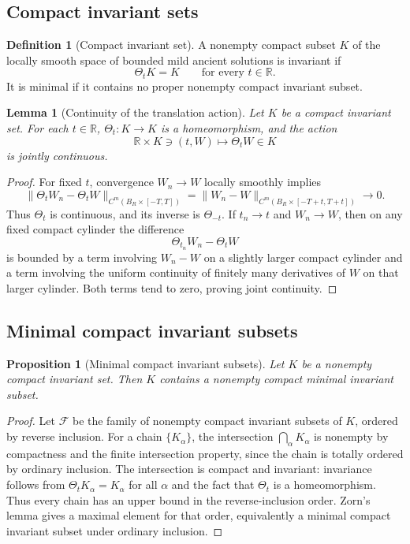 \documentclass[11pt]{amsart}
\theoremstyle{plain}
\newtheorem{lemma}[lemma]{Lemma}
\newtheorem{proposition}[proposition]{Proposition}
\theoremstyle{definition}
\newtheorem{definition}[definition]{Definition}
\theoremstyle{remark}
\numberwithin{equation}{section}
\newcommand{\R}{\mathbb R}
\begin{document}
\subsection{Compact invariant sets}

\begin{definition}[Compact invariant set]\label{p2:def:compact-invariant}
A nonempty compact subset \(K\) of the locally smooth space of bounded mild
ancient solutions is invariant if
\[
   \Theta_tK=K
   \qquad\text{for every }t\in\R .
\]
It is minimal if it contains no proper nonempty compact invariant subset.
\end{definition}

\begin{lemma}[Continuity of the translation action]\label{p2:lem:action-continuity}
Let \(K\) be a compact invariant set.  For each \(t\in\R\),
\(\Theta_t:K\to K\) is a homeomorphism, and the action
\[
   \R\times K\ni(t,W)\mapsto \Theta_tW\in K
\]
is jointly continuous.
\end{lemma}

\begin{proof}
For fixed \(t\), convergence \(W_n\to W\) locally smoothly implies
\[
   \|\Theta_tW_n-\Theta_tW\|_{C^m(B_R\times[-T,T])}
   =
   \|W_n-W\|_{C^m(B_R\times[-T+t,T+t])}\to0.
\]
Thus \(\Theta_t\) is continuous, and its inverse is \(\Theta_{-t}\).  If
\(t_n\to t\) and \(W_n\to W\), then on any fixed compact cylinder the
difference
\[
   \Theta_{t_n}W_n-\Theta_tW
\]
is bounded by a term involving \(W_n-W\) on a slightly larger compact cylinder
and a term involving the uniform continuity of finitely many derivatives of
\(W\) on that larger cylinder.  Both terms tend to zero, proving joint
continuity.
\end{proof}

\subsection{Minimal compact invariant subsets}

\begin{proposition}[Minimal compact invariant subsets]\label{p2:prop:minimal-subset}
Let \(K\) be a nonempty compact invariant set.  Then \(K\) contains a
nonempty compact minimal invariant subset.
\end{proposition}

\begin{proof}
Let \(\mathcal F\) be the family of nonempty compact invariant subsets of
\(K\), ordered by reverse inclusion.  For a chain \(\{K_\alpha\}\), the
intersection \(\bigcap_\alpha K_\alpha\) is nonempty by compactness and the
finite intersection property, since the chain is totally ordered by ordinary
inclusion.  The intersection is compact and invariant: invariance follows
from \(\Theta_tK_\alpha=K_\alpha\) for all \(\alpha\) and the fact that
\(\Theta_t\) is a homeomorphism.  Thus every chain has an upper bound in the
reverse-inclusion order.  Zorn's lemma gives a maximal element for that order,
equivalently a minimal compact invariant subset under ordinary inclusion.
\end{proof}
\end{document}
